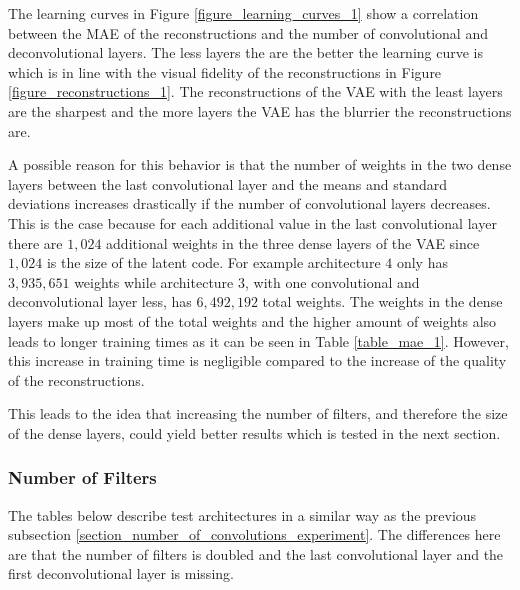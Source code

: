 The learning curves in Figure \ref{figure_learning_curves_1} show a correlation between the MAE of the
reconstructions and the number of convolutional and deconvolutional layers. The less layers the are the better
the learning curve is which is in line with the visual fidelity of the reconstructions in Figure 
\ref{figure_reconstructions_1}. The reconstructions of the VAE with the least layers are the sharpest and the 
more layers the VAE has the blurrier the reconstructions are. 

A possible reason for this behavior is that the number of weights in the two dense layers between the 
last convolutional layer and the means and standard deviations increases drastically
if the number of convolutional layers decreases. This is the case because for each additional
value in the last convolutional layer there are $1,024$ additional weights in the three dense layers of the VAE
since $1,024$ is the size of the latent code. For example architecture $4$ only has $3,935,651$ weights while
architecture $3$, with one convolutional and deconvolutional layer less, has $6,492,192$ total weights.
The weights in the dense layers make up most of the total weights
and the higher amount of weights also leads to longer training times as it can be seen in Table \ref{table_mae_1}.
However, this increase in training time is negligible compared to the increase of the quality of the reconstructions. 

This leads to the idea that increasing the number of filters, and therefore the size of the dense layers, could yield
better results which is tested in the next section.



\subsubsection{Number of Filters} \label{section_number_of_filters}

The tables below describe test architectures in a similar way as the previous subsection 
\ref{section_number_of_convolutions_experiment}. The differences here are that the number of filters is doubled and
the last convolutional layer and the first deconvolutional layer is missing.

